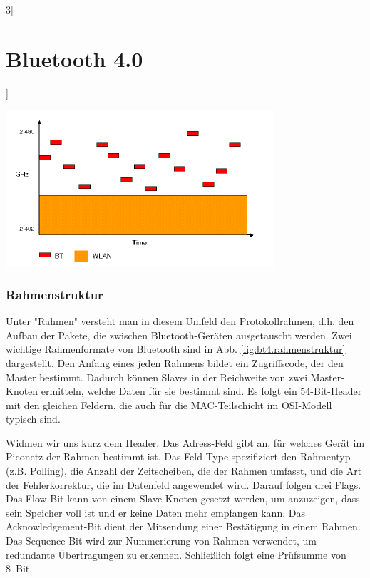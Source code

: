 \begin{multicols}{3}[\section{Bluetooth 4.0}]
\begin{Figure}
\includegraphics[width=\linewidth]{Kapitel/Bluetooth_4/Grafiken/frequenzsprung.png}
\label{fig:bt4.verfahren}
\end{Figure}

\subsubsection*{Rahmenstruktur}
Unter "Rahmen" versteht man in diesem Umfeld den Protokollrahmen, d.h. den Aufbau der Pakete, die zwischen Bluetooth-Geräten ausgetauscht werden. Zwei wichtige Rahmenformate von Bluetooth sind in Abb. \ref{fig:bt4.rahmenstruktur} dargestellt. Den Anfang eines jeden Rahmens bildet ein Zugriffscode, der den Master bestimmt. Dadurch können Slaves in der Reichweite von zwei Master-Knoten ermitteln, welche Daten für sie bestimmt sind. Es folgt ein 54-Bit-Header mit den gleichen Feldern, die auch für die MAC-Teilschicht im OSI-Modell typisch sind. 

Widmen wir uns kurz dem Header. Das Adress-Feld gibt an, für welches Gerät im Piconetz der Rahmen bestimmt ist. Das Feld Type spezifiziert den Rahmentyp (z.B. Polling), die Anzahl der Zeitscheiben, die der Rahmen umfasst, und die Art der Fehlerkorrektur, die im Datenfeld angewendet wird. Darauf folgen drei Flags. Das Flow-Bit kann von einem Slave-Knoten gesetzt werden, um anzuzeigen, dass sein Speicher voll ist und er keine Daten mehr empfangen kann. Das Acknowledgement-Bit dient der Mitsendung einer Bestätigung in einem Rahmen. Das Sequence-Bit wird zur Nummerierung von Rahmen verwendet, um redundante Übertragungen zu erkennen. Schließlich folgt eine Prüfsumme von 8~Bit.


\end{multicols}
